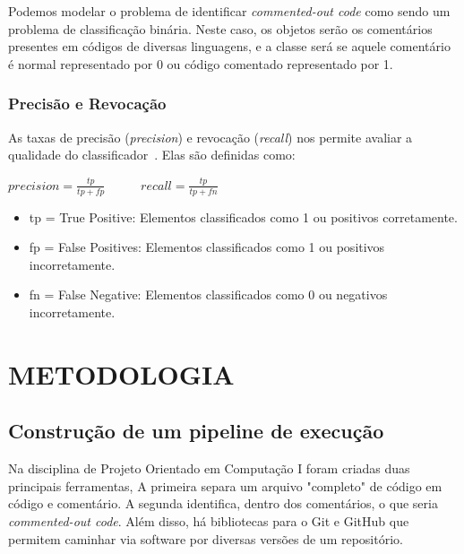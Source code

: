 \documentclass{abnt}
\begin{document}
Podemos modelar o problema de identificar \textit{commented-out code} como sendo um problema
de classificação binária. Neste caso, os objetos serão os comentários presentes em 
códigos de diversas linguagens, e a classe será se aquele comentário é normal 
representado por 0 ou código comentado representado por 1.

\subsection{Precisão e Revocação}
As taxas de precisão (\textit{precision}) e revocação (\textit{recall}) nos permite avaliar a qualidade do classificador~\cite{powers2011evaluation}.
Elas são definidas como:
\begin{center}
  

\begin{math}
  precision = \frac{tp}{tp +fp}
\end{math}~~~~~
\begin{math}
  recall = \frac{tp}{tp +fn}
\end{math}
\end{center}

\begin{itemize}
  \item tp = True Positive: Elementos classificados como 1 ou positivos corretamente.
  \item fp = False Positives: Elementos classificados como 1 ou positivos incorretamente.
  \item fn = False Negative: Elementos classificados como 0 ou negativos incorretamente.
\end{itemize}


\chapter{METODOLOGIA}


\section{Construção de um pipeline de execução }

Na disciplina de Projeto Orientado em Computação I foram criadas duas principais ferramentas,
A primeira separa um arquivo "completo" de código em código e comentário. A segunda identifica,
dentro dos comentários, o que seria \textit{commented-out code}. Além disso, há bibliotecas 
para o Git e GitHub que permitem caminhar via software por diversas versões de um repositório.
\end{document}
